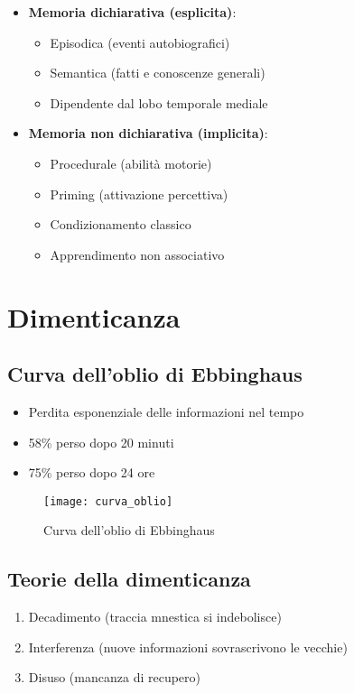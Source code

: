 \documentclass[11pt]{article}
\begin{document}
\begin{itemize}
    \item \textbf{Memoria dichiarativa (esplicita)}:
    \begin{itemize}
        \item Episodica (eventi autobiografici)
        \item Semantica (fatti e conoscenze generali)
        \item Dipendente dal lobo temporale mediale
    \end{itemize}
    
    \item \textbf{Memoria non dichiarativa (implicita)}:
    \begin{itemize}
        \item Procedurale (abilità motorie)
        \item Priming (attivazione percettiva)
        \item Condizionamento classico
        \item Apprendimento non associativo
    \end{itemize}
\end{itemize}

\section*{Dimenticanza}

\subsection*{Curva dell'oblio di Ebbinghaus}
\begin{itemize}
    \item Perdita esponenziale delle informazioni nel tempo
    \item 58\% perso dopo 20 minuti
    \item 75\% perso dopo 24 ore
\end{itemize}

\begin{figure}[h]
    \centering
    \texttt{[image: curva\_oblio]} %
    \caption{Curva dell'oblio di Ebbinghaus}
    \label{fig:ebbinghaus}
\end{figure}

\subsection*{Teorie della dimenticanza}
\begin{enumerate}
    \item Decadimento (traccia mnestica si indebolisce)
    \item Interferenza (nuove informazioni sovrascrivono le vecchie)
    \item Disuso (mancanza di recupero)
\end{enumerate}
\end{document}
